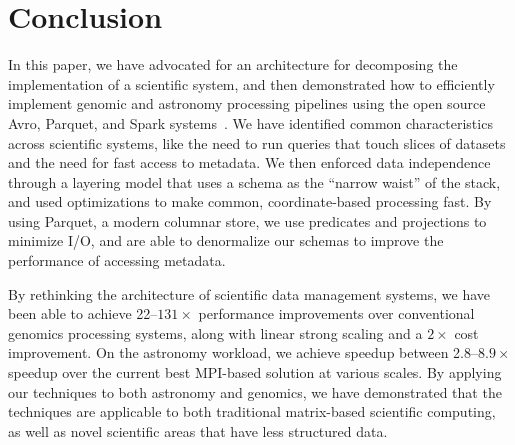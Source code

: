 \documentclass[masters]{ucbthesis}
\begin{document}
\section{Conclusion}
\label{sec:conclusion}

In this paper, we have advocated for an architecture for decomposing the implementation of a scientific
system, and then demonstrated how to efficiently implement genomic and astronomy processing pipelines using
the open source Avro, Parquet, and Spark systems~\cite{avro, parquet, zaharia10}. We have identified common
characteristics across scientific systems, like the need to run queries that touch slices of datasets and the need
for fast access to metadata. We then enforced data independence through a layering model that uses a schema
as the ``narrow waist'' of the stack, and used optimizations to make common, coordinate-based processing
fast. By using Parquet, a modern columnar store, we use predicates and projections to minimize I/O, and are able
to denormalize our schemas to improve the performance of accessing metadata.

By rethinking the architecture of scientific data management systems, we have been able to achieve
22--$131\times$ performance improvements over conventional genomics processing systems, along with linear
strong scaling and a $2\times$ cost improvement. On the astronomy workload, we achieve speedup between
2.8--$8.9\times$ speedup over the current best MPI-based solution at various scales. By applying our techniques
to both astronomy and genomics, we have demonstrated that the techniques are applicable to both traditional
matrix-based scientific computing, as well as novel scientific areas that have less structured data.

\balance

\appendix



\end{document}

